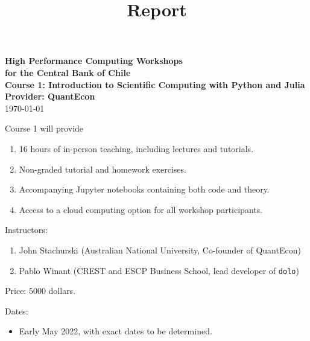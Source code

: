 \documentclass[12pt]{article}
\begin{document}
\title{Report}

\date{}


\begin{center}
    {\bf {\Large High Performance Computing Workshops \\
            for the Central Bank of Chile
    \\
    \vspace{1em}
    {\Large Course 1: Introduction to Scientific Computing with Python and Julia}
    \\
    \vspace{1em}
    Provider: QuantEcon \\
    }}
    \vspace{1em}
    \today
\end{center}


\vspace{.01in}







\thispagestyle{fancy}
Course 1 will provide 
%
\begin{enumerate}
    \item 16 hours of in-person teaching, including lectures and
        tutorials.
    \item Non-graded tutorial and homework exercises.
    \item Accompanying Jupyter notebooks containing both code and theory.
    \item Access to a cloud computing option for all workshop participants.
\end{enumerate}

Instructors:
%
\begin{enumerate}
    \item John Stachurski (Australian National University, Co-founder of QuantEcon)
    \item Pablo Winant (CREST and ESCP Business School, lead developer of \texttt{dolo})
\end{enumerate}

Price: $5000$ dollars.

Dates: 
%
\begin{itemize}
    \item Early May 2022, with exact dates to be determined.
\end{itemize}
\end{document}
